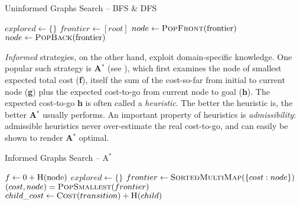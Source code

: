 \\
\\
\teal
\begin{algorithm}[H]
\caption{Uninformed Graphs Search -- BFS \& DFS}\label{alg:TheoryBFSDFS}
\begin{algorithmic}
\EndIf
\State $explored \gets \{\}$
\State $frontier \gets [root]$
\State{}
 \EndIf
 \State $node \gets \Call{PopFront}{$frontier$}$
 \Else
 \State $node \gets \Call{PopBack}{$frontier$}$ \teal {} \black
 \EndIf
\State {}
\EndIf
\State {}
\EndFor
\EndWhile
\EndFunction
\end{algorithmic}
\end{algorithm}
\black
\noindent \textit{Informed} strategies, on the other hand, exploit domain-specific knowledge. One popular such strategy is \textbf{A$^{*}$} (see \cite{DBLP:journals/jacm/DechterP85}), which first examines the node of smallest expected total cost (\textbf{f}), itself the sum of the cost-so-far from initial to current node (\textbf{g}) plus the expected cost-to-go from current node to goal (\textbf{h}). The expected cost-to-go \textbf{h} is often called a \textit{heuristic}. The better the heuristic is, the better \textbf{A$^{*}$} usually performs. An important property of heuristics is \textit{admissibility}: admissible heuristics never over-estimate the real cost-to-go, and can easily be shown to render \textbf{A$^{*}$} optimal.
\teal
\begin{algorithm}[H]
\caption{Informed Graphs Search -- A$^{*}$}\label{alg:TheoryAStar}
\begin{algorithmic}
 \teal {} \black
\State{}
\State $f \gets 0 + \Call{H}{$node$}$
\State $explored \gets \{\}$
\State $frontier \gets \Call{SortedMultiMap}{\{cost: node\}}$
\State{}
 \EndIf
\State $(cost, node) = \Call{PopSmallest}{frontier}$
\EndIf
\State {}
	\State $child\_cost \gets \Call{Cost}{transition} + \Call{H}{child}$
             \\
             \ \ \ \ \ \ \ \ \ \ \ \ \ \ \ \ \ \ \ \ \ \ \ \ 
	\EndIf
\EndFor
\EndWhile
\EndFunction
\end{algorithmic}
\end{algorithm}
\black


